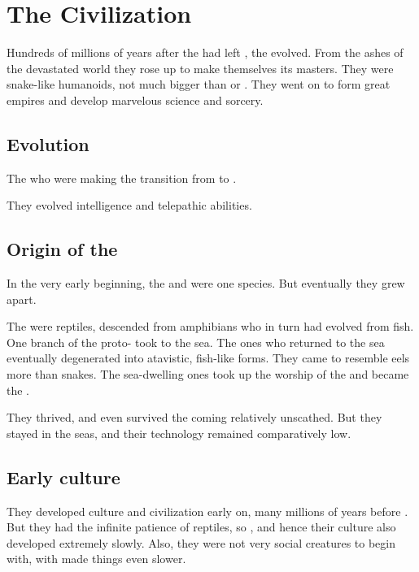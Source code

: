 \section{The \Ophidian{} Civilization}
Hundreds of millions of years after the \voyagers{} had left \Miith{}, the \ophidians{} evolved. 
From the ashes of the devastated world they rose up to make themselves its masters.
They were snake-like humanoids, not much bigger than \humans{} or \scathae. 
They went on to form great empires and develop marvelous science and sorcery.









\subsection{Evolution}
The \ophidians{}  who were making the transition from  to . 

They evolved intelligence and telepathic abilities. 









\subsection{Origin of the \nagae}
In the very early beginning, the \ophidians{} and \nagae{} were one species. 
But eventually they grew apart. 

The \ophidians{} were reptiles, descended from amphibians who in turn had evolved from fish. 
One branch of the proto-\ophidians{} took to the sea. 
The ones who returned to the sea eventually degenerated into atavistic, fish-like forms. 
They came to resemble eels more than snakes. 
The sea-dwelling ones took up the worship of the \Krakens{} and became the \nagae{}.  

They thrived, and even survived the coming \firstbanewar{} relatively unscathed. 
But they stayed in the seas, and their technology remained comparatively low. 









\subsection{Early culture}
They developed culture and civilization early on, many millions of years before \Tiamat. 
But they had the infinite patience of reptiles, so , and hence their culture also developed extremely slowly. 
Also, they were not very social creatures to begin with, with made things even slower. 

